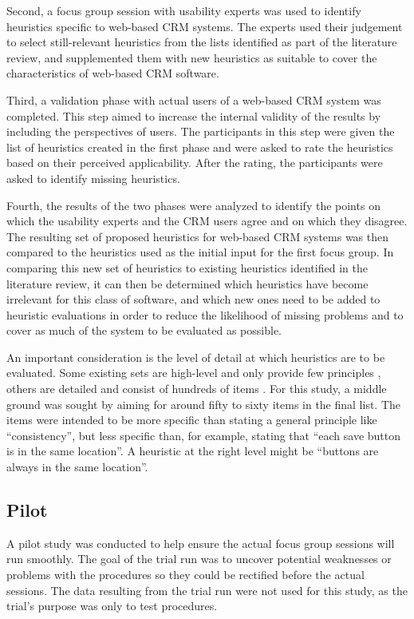 Second, a focus group session with usability experts was used to identify heuristics specific to web-based CRM systems. The experts used their judgement to select still-relevant heuristics from the lists identified as part of the literature review, and supplemented them with new heuristics as suitable to cover the characteristics of web-based CRM software.

Third, a validation phase with actual users of a web-based CRM system was completed. This step aimed to increase the internal validity of the results by including the perspectives of users. The participants in this step were given the list of heuristics created in the first phase and were asked to rate the heuristics based on their perceived applicability. After the rating, the participants were asked to identify missing heuristics.

Fourth, the results of the two phases were analyzed to identify the points on which the usability experts and the CRM users agree and on which they disagree. The resulting set of proposed heuristics for web-based CRM systems was then compared to the heuristics used as the initial input for the first focus group. In comparing this new set of heuristics to existing heuristics identified in the literature review, it can then be determined which heuristics have become irrelevant for this class of software, and which new ones need to be added to heuristic evaluations in order to reduce the likelihood of missing problems and to cover as much of the system to be evaluated as possible.

An important consideration is the level of detail at which heuristics are to be evaluated. Some existing sets are high-level and only provide few principles \citep[e.g.][]{Molich1990}, others are detailed and consist of hundreds of items \citep[e.g.][]{Leavitt2006}. For this study, a middle ground was sought by aiming for around fifty to sixty items in the final list. The items were intended to be more specific than stating a general principle like ``consistency'', but less specific than, for example, stating that ``each save button is in the same location''. A heuristic at the right level might be ``buttons are always in the same location''.

\subsection{Pilot}
A pilot study was conducted to help ensure the actual focus group sessions will run smoothly. The goal of the trial run was to uncover potential weaknesses or problems with the procedures so they could be rectified before the actual sessions. The data resulting from the trial run were not used for this study, as the trial's purpose was only to test procedures.

